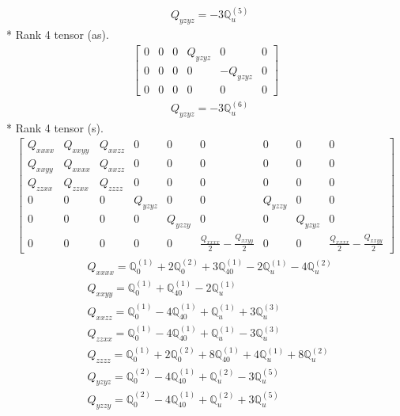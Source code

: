 \documentclass[fleqn,8pt,landscape]{jsarticle}
\begin{document}
\begin{align*}
& Q_{yzyz} = - 3 \mathbb{Q}_{u}^{(5)}
\end{align*}
* Rank 4 tensor (as).
\begin{align*}
\begin{bmatrix} 0 & 0 & 0 & Q_{yzyz} & 0 & 0 \\ 0 & 0 & 0 & 0 & - Q_{yzyz} & 0 \\ 0 & 0 & 0 & 0 & 0 & 0 \end{bmatrix}
\end{align*}
\begin{align*}
& Q_{yzyz} = - 3 \mathbb{Q}_{u}^{(6)}
\end{align*}
* Rank 4 tensor (s).
\begin{align*}
\begin{bmatrix} Q_{xxxx} & Q_{xxyy} & Q_{xxzz} & 0 & 0 & 0 & 0 & 0 & 0 \\ Q_{xxyy} & Q_{xxxx} & Q_{xxzz} & 0 & 0 & 0 & 0 & 0 & 0 \\ Q_{zzxx} & Q_{zzxx} & Q_{zzzz} & 0 & 0 & 0 & 0 & 0 & 0 \\ 0 & 0 & 0 & Q_{yzyz} & 0 & 0 & Q_{yzzy} & 0 & 0 \\ 0 & 0 & 0 & 0 & Q_{yzzy} & 0 & 0 & Q_{yzyz} & 0 \\ 0 & 0 & 0 & 0 & 0 & \frac{Q_{xxxx}}{2} - \frac{Q_{xxyy}}{2} & 0 & 0 & \frac{Q_{xxxx}}{2} - \frac{Q_{xxyy}}{2} \end{bmatrix}
\end{align*}
\begin{align*}
& Q_{xxxx} = \mathbb{Q}_{0}^{(1)} + 2 \mathbb{Q}_{0}^{(2)} + 3 \mathbb{Q}_{40}^{(1)} - 2 \mathbb{Q}_{u}^{(1)} - 4 \mathbb{Q}_{u}^{(2)} \\
& Q_{xxyy} = \mathbb{Q}_{0}^{(1)} + \mathbb{Q}_{40}^{(1)} - 2 \mathbb{Q}_{u}^{(1)} \\
& Q_{xxzz} = \mathbb{Q}_{0}^{(1)} - 4 \mathbb{Q}_{40}^{(1)} + \mathbb{Q}_{u}^{(1)} + 3 \mathbb{Q}_{u}^{(3)} \\
& Q_{zzxx} = \mathbb{Q}_{0}^{(1)} - 4 \mathbb{Q}_{40}^{(1)} + \mathbb{Q}_{u}^{(1)} - 3 \mathbb{Q}_{u}^{(3)} \\
& Q_{zzzz} = \mathbb{Q}_{0}^{(1)} + 2 \mathbb{Q}_{0}^{(2)} + 8 \mathbb{Q}_{40}^{(1)} + 4 \mathbb{Q}_{u}^{(1)} + 8 \mathbb{Q}_{u}^{(2)} \\
& Q_{yzyz} = \mathbb{Q}_{0}^{(2)} - 4 \mathbb{Q}_{40}^{(1)} + \mathbb{Q}_{u}^{(2)} - 3 \mathbb{Q}_{u}^{(5)} \\
& Q_{yzzy} = \mathbb{Q}_{0}^{(2)} - 4 \mathbb{Q}_{40}^{(1)} + \mathbb{Q}_{u}^{(2)} + 3 \mathbb{Q}_{u}^{(5)}
\end{align*}
\end{document}
